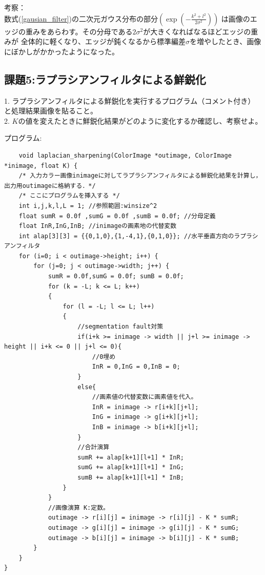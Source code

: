 \documentclass[a4paper,titlepage,11pt]{ltjsarticle}
\begin{document}
考察：\\
数式(\ref{gausian_filter})の二次元ガウス分布の部分$(\exp(-\frac{k^{2}+l^{2}}{2\sigma^{2}}))$
は画像のエッジの重みをあらわす。その分母である$2\sigma^{2}$が大きくなればなるほどエッジの重みが
全体的に軽くなり、エッジが鈍くなるから標準編差$\sigma$を増やしたとき、画像にぼかしがかかったようになった。

\subsection*{課題5:ラプラシアンフィルタによる鮮鋭化}
1. ラプラシアンフィルタによる鮮鋭化を実行するプログラム（コメント付き）
と処理結果画像を貼ること。
\\2. $K$の値を変えたときに鮮鋭化結果がどのように変化するか確認し、考察せよ。

プログラム:
\begin{lstlisting}
	void laplacian_sharpening(ColorImage *outimage, ColorImage *inimage, float K) {
    /* 入力カラー画像inimageに対してラプラシアンフィルタによる鮮鋭化結果を計算し，出力用outimageに格納する．*/
    /* ここにプログラムを挿入する */
    int i,j,k,l,L = 1; //参照範囲:winsize^2
    float sumR = 0.0f ,sumG = 0.0f ,sumB = 0.0f; //分母定義
    float InR,InG,InB; //inimageの画素地の代替変数
    int alap[3][3] = {{0,1,0},{1,-4,1},{0,1,0}}; //水平垂直方向のラプラシアンフィルタ
    for (i=0; i < outimage->height; i++) {
        for (j=0; j < outimage->width; j++) {
            sumR = 0.0f,sumG = 0.0f; sumB = 0.0f;
            for (k = -L; k <= L; k++)
            {
                for (l = -L; l <= L; l++)
                {
                    //segmentation fault対策
                    if(i+k >= inimage -> width || j+l >= inimage -> height || i+k <= 0 || j+l <= 0){
                        //0埋め
                        InR = 0,InG = 0,InB = 0;
                    }
                    else{
                        //画素値の代替変数に画素値を代入。
                        InR = inimage -> r[i+k][j+l];
                        InG = inimage -> g[i+k][j+l];
                        InB = inimage -> b[i+k][j+l];
                    }
                    //合計演算
                    sumR += alap[k+1][l+1] * InR;
                    sumG += alap[k+1][l+1] * InG;
                    sumB += alap[k+1][l+1] * InB;
                }
            }
            //画像演算 K:定数。
            outimage -> r[i][j] = inimage -> r[i][j] - K * sumR;
            outimage -> g[i][j] = inimage -> g[i][j] - K * sumG;
            outimage -> b[i][j] = inimage -> b[i][j] - K * sumB;
        }
    }
}
\end{lstlisting}
\end{document}
